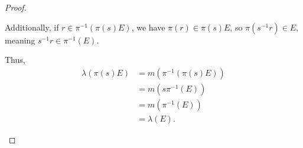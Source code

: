 \begin{proof}
\begin{enumerate}[(1)]
      Additionally, if $r\in \pi^{-1}\left(\pi(s)E\right)$, we have $\pi(r)\in \pi(s)E$, so $\pi\left(s^{-1}r\right)\in E$, meaning $s^{-1}r\in \pi^{-1}(E)$.\newline

      Thus,
      \begin{align*}
        \lambda\left(\pi\left(s\right)E\right) &= m\left(\pi^{-1}\left(\pi\left(s\right)E\right)\right)\\
                                               &= m\left(s\pi^{-1}\left(E\right)\right)\\
                                               &= m\left(\pi^{-1}\left(E\right)\right)\\
                                               &= \lambda\left(E\right).
      \end{align*}
  \end{enumerate}
\end{proof}
